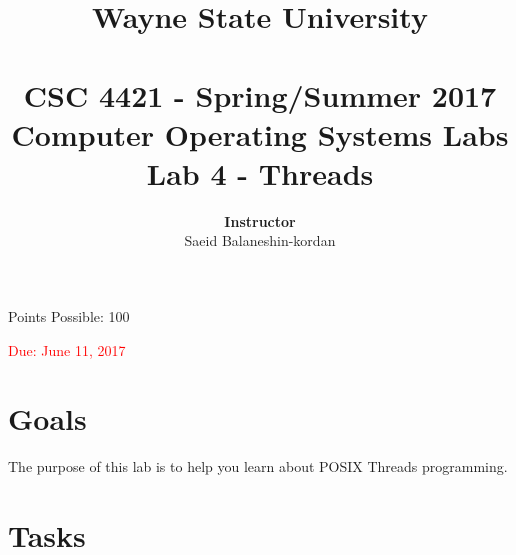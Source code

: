 \documentclass[16pt]{article}
\begin{document}
\title{\huge \textbf{Wayne State University \\
 \vline \\
\Huge CSC 4421 - Spring/Summer 2017 \\
 Computer Operating Systems Labs\\
 Lab 4 - Threads}\\
 \vline
 }
\author{\textbf{Instructor}  \vspace{0.2cm} \\ Saeid Balaneshin-kordan\\
}
\date{}
\maketitle

\begin{center}
\Large Points Possible: 100

\textcolor{red}{Due: June 11, 2017}
\end{center}

\section*{Goals}

The purpose of this lab is to help you learn about POSIX Threads programming.

\section*{Tasks}
\end{document}
